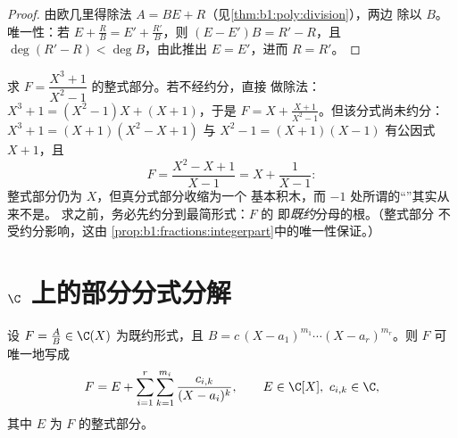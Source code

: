 \begin{proof}
由欧几里得除法 $A = BE + R$（见\cref{thm:b1:poly:division}），两边
除以 $B$。唯一性：若 $E + \frac RB = E' + \frac{R'}{B}$，则 $(E -
E')B = R' - R$，且 $\deg(R' - R) < \deg B$，由此推出 $E = E'$，进而 $R
= R'$。
\end{proof}

\begin{example}\label{ex:b1:fractions:integerpart}
求 $F = \dfrac{X^3 + 1}{X^2 - 1}$ 的整式部分。若不经约分，直接
做除法：$X^3 + 1 = (X^2 - 1)X + (X + 1)$，于是 $F = X +
\frac{X + 1}{X^2 - 1}$。但该分式尚未约分：$X^3 + 1
= (X + 1)(X^2 - X + 1)$ 与 $X^2 - 1 = (X+1)(X-1)$ 有公因式
$X + 1$，且
\[
F = \frac{X^2 - X + 1}{X - 1} = X + \frac{1}{X - 1} :
\]
整式部分仍为 $X$，但真分式部分收缩为一个
基本积木，而 $-1$ 处所谓的“”其实从来不是。
求之前，务必先约分到最简形式：$F$ 的
即\emph{既约}分母的根。（整式部分
不受约分影响，这由
\cref{prop:b1:fractions:integerpart}中的唯一性保证。）
\end{example}

\section{$\C$ 上的部分分式分解}

\begin{theorem}[$\C$ 上的分解]\label{thm:b1:fractions:complex}
设 $F = \frac AB \in \C(X)$ 为既约形式，且 $B = c\,(X -
a_1)^{m_1} \cdots (X - a_r)^{m_r}$。则 $F$ 可唯一地写成
\[
F = E + \sum_{i=1}^{r} \sum_{k=1}^{m_i}
\frac{c_{i,k}}{(X - a_i)^k},
\qquad E \in \C[X],\ c_{i,k} \in \C ,
\]
其中 $E$ 为 $F$ 的整式部分。
\end{theorem}


